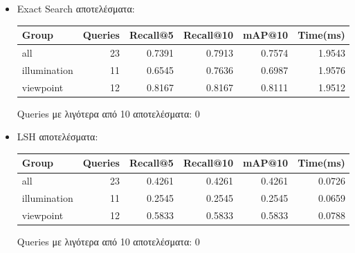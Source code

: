 \documentclass [conference]{IEEEtran}
\begin{document}
\begin{itemize}

    \item Exact Search αποτελέσματα:
    \begin{table}[H]
    \centering
    \small
    \setlength{\tabcolsep}{3pt}
    \begin{tabular}{l r r r r r}
    \hline
    \textbf{Group} & \textbf{Queries} & \textbf{Recall@5} & \textbf{Recall@10} & \textbf{mAP@10} & \textbf{Time(ms)} \\
    \hline
    all & 23 & 0.7391 & 0.7913 & 0.7574 & 1.9543 \\
    illumination & 11 & 0.6545 & 0.7636 & 0.6987 & 1.9576 \\
    viewpoint & 12 & 0.8167 & 0.8167 & 0.8111 & 1.9512 \\
    \hline
    \end{tabular}
    \par\smallskip
    \footnotesize Queries με λιγότερα από 10 αποτελέσματα: 0
    \end{table}
    

    \item LSH αποτελέσματα:
    \begin{table}[H]
    \centering
    \small
    \setlength{\tabcolsep}{3pt}
    \begin{tabular}{l r r r r r}
    \hline
    \textbf{Group} & \textbf{Queries} & \textbf{Recall@5} & \textbf{Recall@10} & \textbf{mAP@10} & \textbf{Time(ms)} \\
    \hline
    all & 23 & 0.4261 & 0.4261 & 0.4261 & 0.0726 \\
    illumination & 11 & 0.2545 & 0.2545 & 0.2545 & 0.0659 \\
    viewpoint & 12 & 0.5833 & 0.5833 & 0.5833 & 0.0788 \\
    \hline
    \end{tabular}
    \par\smallskip
    \footnotesize Queries με λιγότερα από 10 αποτελέσματα: 0
    \end{table}



\end{itemize}
\end{document}
